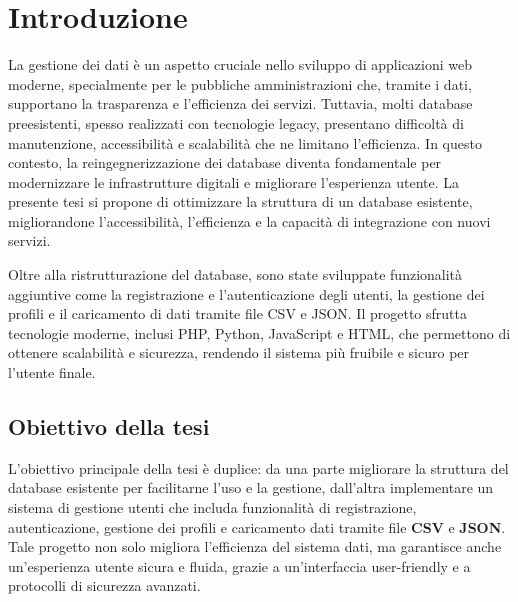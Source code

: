 %
\chapter*{Introduzione}

La gestione dei dati è un aspetto cruciale nello sviluppo di applicazioni web moderne, specialmente per le pubbliche amministrazioni che, tramite i dati, supportano la trasparenza e l’efficienza dei servizi. Tuttavia, molti database preesistenti, spesso realizzati con tecnologie legacy, presentano difficoltà di manutenzione, accessibilità e scalabilità che ne limitano l'efficienza. In questo contesto, la reingegnerizzazione dei database diventa fondamentale per modernizzare le infrastrutture digitali e migliorare l’esperienza utente. La presente tesi si propone di ottimizzare la struttura di un database esistente, migliorandone l’accessibilità, l’efficienza e la capacità di integrazione con nuovi servizi.

Oltre alla ristrutturazione del database, sono state sviluppate funzionalità aggiuntive come la registrazione e l'autenticazione degli utenti, la gestione dei profili e il caricamento di dati tramite file CSV e JSON. Il progetto sfrutta tecnologie moderne, inclusi PHP, Python, JavaScript e HTML, che permettono di ottenere scalabilità e sicurezza, rendendo il sistema più fruibile e sicuro per l’utente finale.

\section*{Obiettivo della tesi}
L’obiettivo principale della tesi è duplice: da una parte migliorare la struttura del database esistente per facilitarne l'uso e la gestione, dall’altra implementare un sistema di gestione utenti che includa funzionalità di registrazione, autenticazione, gestione dei profili e caricamento dati tramite file \textbf{CSV} e \textbf{JSON}. Tale progetto non solo migliora l’efficienza del sistema dati, ma garantisce anche un’esperienza utente sicura e fluida, grazie a un’interfaccia user-friendly e a protocolli di sicurezza avanzati.

